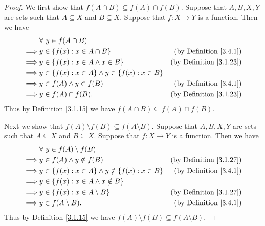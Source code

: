 \begin{proof}
    We first show that \(f(A \cap B) \subseteq f(A) \cap f(B)\).
    Suppose that \(A, B, X, Y\) are sets such that \(A \subseteq X\) and \(B \subseteq X\).
    Suppose that \(f : X \to Y\) is a function.
    Then we have
    \begin{align*}
                 & \forall\ y \in f(A \cap B)                                                                    \\
        \implies & y \in \{f(x) : x \in A \cap B\}                         & \text{(by Definition \ref{3.4.1})}  \\
        \implies & y \in \{f(x) : x \in A \land x \in B\}                  & \text{(by Definition \ref{3.1.23})} \\
        \implies & y \in \{f(x) : x \in A\} \land y \in \{f(x) : x \in B\}                                       \\
        \implies & y \in f(A) \land y \in f(B)                             & \text{(by Definition \ref{3.4.1})}  \\
        \implies & y \in f(A) \cap f(B).                                   & \text{(by Definition \ref{3.1.23})}
    \end{align*}
    Thus by Definition \ref{3.1.15} we have \(f(A \cap B) \subseteq f(A) \cap f(B)\).

    Next we show that \(f(A) \setminus f(B) \subseteq f(A \setminus B)\).
    Suppose that \(A, B, X, Y\) are sets such that \(A \subseteq X\) and \(B \subseteq X\).
    Suppose that \(f : X \to Y\) is a function.
    Then we have
    \begin{align*}
                 & \forall\ y \in f(A) \setminus f(B)                                                               \\
        \implies & y \in f(A) \land y \notin f(B)                             & \text{(by Definition \ref{3.1.27})} \\
        \implies & y \in \{f(x) : x \in A\} \land y \notin \{f(x) : x \in B\} & \text{(by Definition \ref{3.4.1})}  \\
        \implies & y \in \{f(x) : x \in A \land x \notin B\}                                                        \\
        \implies & y \in \{f(x) : x \in A \setminus B\}                       & \text{(by Definition \ref{3.1.27})} \\
        \implies & y \in f(A \setminus B).                                    & \text{(by Definition \ref{3.4.1})}
    \end{align*}
    Thus by Definition \ref{3.1.15} we have \(f(A) \setminus f(B) \subseteq f(A \setminus B)\).


\end{proof}
